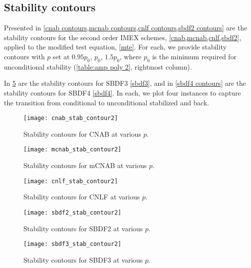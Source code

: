 \subsection{Stability contours}
Presented in \cref{cnab contours,mcnab contours,cnlf contours,sbdf2 contours} are the stability contours for the second order IMEX schemes, \cref{cnab,mcnab,cnlf,sbdf2}, applied to the modified test equation, \cref{mte}. For each, we provide stability contours with $p$ set at $0.95p_0$, $p_0$, $1.5p_0$, where $p_0$ is the minimum required for unconditional stability (\cref{table:amp poly 2}, rightmost column). 

In \cref{sbdf3 contours} are the stability contours for SBDF3 \cref{sbdf3}, and in \cref{sbdf4 contours} are the stability contours for SBDF4 \cref{sbdf4}. In each, we plot four instances to capture the transition from conditional to unconditional stabilized and back.
\begin{figure}[htb!]
        \centering
\texttt{[image: cnab\_stab\_contour2]}
\caption{Stability contours for CNAB at various $p$.}
\label{cnab contours}
\end{figure}
\begin{figure}[htb!]
        \centering
\texttt{[image: mcnab\_stab\_contour2]}
\caption{Stability contours for mCNAB at various $p$.}
\label{mcnab contours}
\end{figure}
\begin{figure}[htb!]
        \centering
\texttt{[image: cnlf\_stab\_contour2]}
\caption{Stability contours for CNLF at various $p$.}
\label{cnlf contours}
\end{figure}
\begin{figure}[htb!]
        \centering
\texttt{[image: sbdf2\_stab\_contour2]}
\caption{Stability contours for SBDF2 at various $p$.}
\label{sbdf2 contours}
\end{figure}

\begin{figure}[htb!]
        \centering
\texttt{[image: sbdf3\_stab\_contour2]}
\caption{Stability contours for SBDF3 at various $p$.}
\label{sbdf3 contours}
\end{figure}

